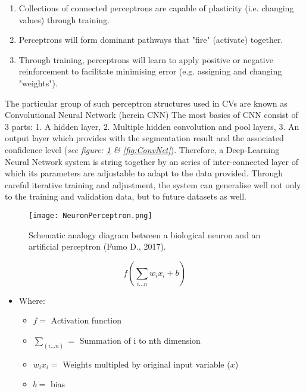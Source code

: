 \documentclass[11pt, a4paper, twoside]{report}
\begin{document}
\begin{enumerate}
  \item Collections of connected perceptrons are capable of plasticity (i.e. changing values) through training.
  \item Perceptrons will form dominant pathways that "fire" (activate) together.
  \item Through training, perceptrons will learn to apply positive or negative reinforcement to facilitate minimising error (e.g. assigning and changing "weights").
\end{enumerate}

The particular group of such perceptron structures used in CVs are known as Convolutional Neural Network (herein CNN) The most basics of CNN consist of 3 parts: 1. A hidden layer, 2. Multiple hidden convolution and pool layers, 3. An output layer which provides with the segmentation result and the associated confidence level (\textit{see figure: \ref{fig:NeuronPerceptron} & \ref{fig:ConvNet}}). Therefore, a Deep-Learning Neural Network system is string together by an series of inter-connected layer of which its parameters are adjustable to adapt to the data provided. Through careful iterative training and adjustment, the system can generalise well not only to the training and validation data, but to future datasets as well.\\\par

\begin{figure}[H]
\centering
\texttt{[image: NeuronPerceptron.png]}
  \caption{Schematic analogy diagram between a biological neuron and an artificial perceptron (Fumo D., 2017).}
\label{fig:NeuronPerceptron}
\end{figure}

\begin{equation}
  \label{weights&bias}
  f(\sum_{i ... n} w_{i} x_{i} + b)
\end{equation}

\begin{itemize}
  \item Where:
    \begin{itemize}
      \item $f =$ Activation function
      \item $\sum_{(i ... n)} =$ Summation of i to nth dimension
      \item $w_{i} x_{i} =$ Weights multipled by original input variable ($x$)
      \item $b =$ bias
    \end{itemize}
\end{itemize}
\end{document}
